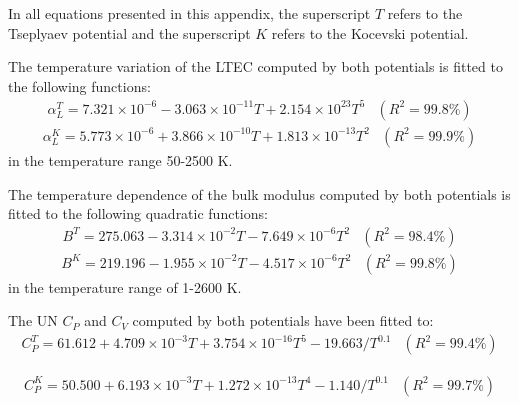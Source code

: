 \documentclass[preprint, 12pt]{elsarticle}
\begin{document}
In all equations presented in this appendix, the superscript $T$ refers to the Tseplyaev potential and the superscript $K$ refers to the Kocevski potential.

The temperature variation of the LTEC computed by both potentials is fitted to the following functions: 
\begin{equation}
\begin{array}{cc}
\alpha_L^T = 7.321 \times 10^{-6} - 3.063 \times 10^{-11} T + 2.154 \times 10^{23} T^5 & \left( R^2 = 99.8\% \right)
\end{array}
\label{Eq:LTEC1}
\end{equation}
\begin{equation}
\begin{array}{cc}
\alpha_L^{K} = 5.773 \times 10^{-6} + 3.866 \times 10^{-10} T + 1.813 \times 10^{-13} T^2 & \left( R^2 = 99.9\% \right)
\end{array}
\label{Eq:LTEC2}
\end{equation}
in the temperature range 50-2500 K.

The temperature dependence of the bulk modulus computed by both potentials is fitted to the following quadratic functions:
\begin{equation}
\begin{array}{cc}
B^T = 275.063 - 3.314 \times 10^{-2} T - 7.649 \times 10^{-6} T^2 & \left( R^2 = 98.4\% \right)
\end{array}
\label{Eq:B1}
\end{equation}
\begin{equation}
\begin{array}{cc}
B^K = 219.196 - 1.955 \times 10^{-2} T - 4.517 \times 10^{-6} T^2 & \left( R^2 = 99.8\% \right)
\end{array}
\label{Eq:B2}
\end{equation}
in the temperature range of 1-2600 K.

The UN $C_P$ and $C_V$ computed by both potentials have been fitted to:
\begin{equation}
\begin{array}{cc}
C_P^T = 61.612 + 4.709 \times 10^{-3} T + 3.754 \times 10^{-16} T^5 - 19.663 / T^{0.1} & \left( R^2 = 99.4\% \right)
\label{CPADP}
\end{array}
\end{equation}

\begin{equation}
\begin{array}{cc}
C_P^K = 50.500 + 6.193 \times 10^{-3} T + 1.272 \times 10^{-13} T^4 - 1.140 / T^{0.1} & \left( R^2 = 99.7\% \right)    
\end{array}
\label{CPEAM}
\end{equation}
\end{document}
